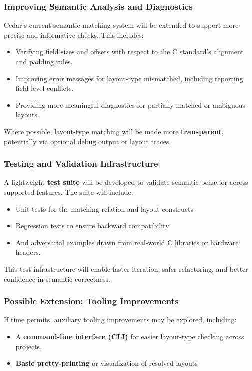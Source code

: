 \documentclass[12pt]{article}
\begin{document}
\subsubsection{Improving Semantic Analysis and Diagnostics}
Cedar's current semantic matching system will be extended to support more
precise and informative checks. This includes:
\begin{itemize}
    \item Verifying field sizes and offsets with respect to the C standard's
    alignment and padding rules.
    \item Improving error messages for layout-type mismatched, including
    reporting field-level conflicts.
    \item Providing more meaningful diagnostics for partially matched or ambiguous
    layouts.
\end{itemize}
Where possible, layout-type matching will be made more \textbf{transparent},
potentially via optional debug output or layout traces.

\subsubsection{Testing and Validation Infrastructure}
A lightweight \textbf{test suite} will be developed to validate semantic
behavior across supported features. The suite will include:
\begin{itemize}
    \item Unit tests for the matching relation and layout constructs
    \item Regression tests to ensure backward compatibility
    \item And adversarial examples drawn from real-world C libraries or hardware headers.
\end{itemize}

This test infrastructure will enable faster iteration, safer refactoring, and
better confidence in semantic correctness.

\subsubsection{Possible Extension: Tooling Improvements}
If time permits, auxiliary tooling improvements may be explored, including:
\begin{itemize}
    \item A \textbf{command-line interface (CLI)} for easier layout-type
    checking across projects,
    \item \textbf{Basic pretty-printing} or visualization of resolved layouts
\end{itemize}
\end{document}
